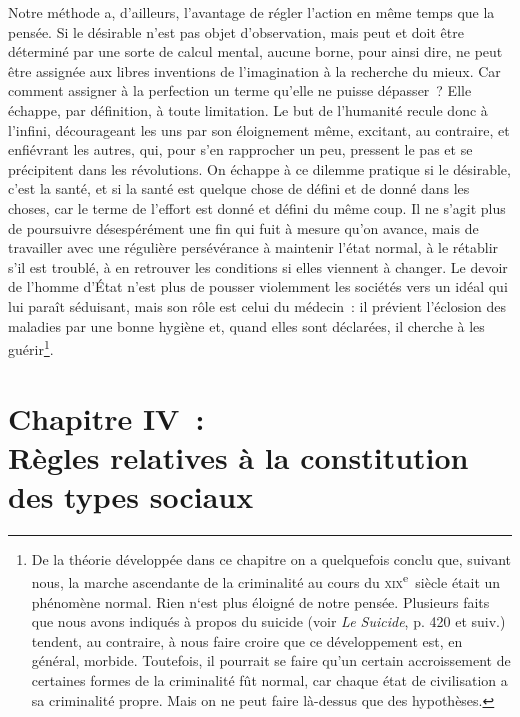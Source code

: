 \documentclass[french,twoside]{book} %
\newcommand\chapteropen{} %
\newcommand\chapterclose{} %
\begin{document}
Notre méthode a, d’ailleurs, l’avantage de régler l’action en même temps que la pensée. Si le désirable n’est pas objet d’observation, mais peut et doit être déterminé par une sorte de calcul mental, aucune borne, pour ainsi dire, ne peut être assignée aux libres inventions de l’imagination à la recherche du mieux. Car comment assigner à la perfection un terme qu’elle ne puisse dépasser ? Elle échappe, par définition, à toute limitation. Le but de l’humanité recule donc à l’infini, décourageant les uns par son éloignement même, excitant, au contraire, et enfiévrant les autres, qui, pour s’en rapprocher un peu, pressent le pas et se précipitent dans les révolutions. On échappe à ce dilemme pratique si le désirable, c’est la santé, et si la santé est quelque chose de défini et de donné dans les choses, car le terme de l’effort est donné et défini du même coup. Il ne s’agit plus de poursuivre désespérément une fin qui fuit à mesure qu’on avance, mais de travailler avec une régulière persévérance à maintenir l’état normal, à le rétablir s’il est troublé, à en retrouver les conditions si elles viennent à changer. Le devoir de l’homme d’État n’est plus de pousser violemment les sociétés vers un idéal qui lui paraît séduisant, mais son rôle est celui du médecin : il prévient l’éclosion des maladies par une bonne hygiène et, quand elles sont déclarées, il cherche à les guérir\footnote{ De la théorie développée dans ce chapitre on a quelquefois conclu que, suivant nous, la marche ascendante de la criminalité au cours du \textsc{xix}\textsuperscript{e} siècle était un phénomène normal. Rien n`est plus éloigné de notre pensée. Plusieurs faits que nous avons indiqués à propos du suicide (voir \emph{Le Suicide}, p. 420 et suiv.) tendent, au contraire, à nous faire croire que ce développement est, en général, morbide. Toutefois, il pourrait se faire qu’un certain accroissement de certaines formes de la criminalité fût normal, car chaque état de civilisation a sa criminalité propre. Mais on ne peut faire là-dessus que des hypothèses.}.
\chapterclose


\chapteropen
\chapter[{Chapitre IV : Règles relatives à la constitution des types sociaux}]{Chapitre IV : \\
Règles relatives à la constitution des types sociaux}\renewcommand{\leftmark}{Chapitre IV : \\
Règles relatives à la constitution des types sociaux}
\end{document}
